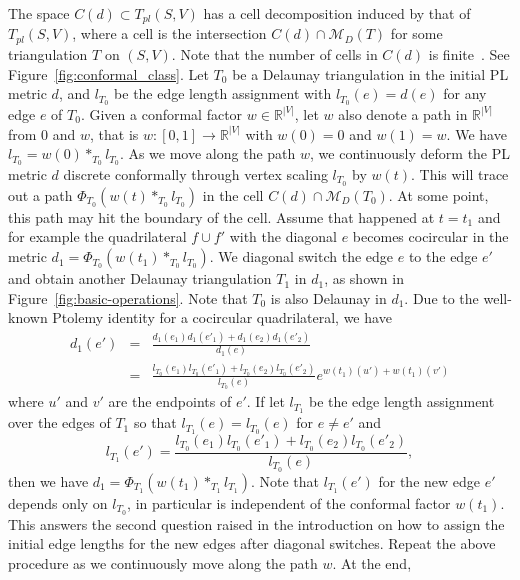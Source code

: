 \documentclass[11pt]{article}
\begin{document}
The space $C(d)\subset T_{pl}(S, V)$ has a cell 
decomposition induced by that of $T_{pl}(S, V)$, where a cell is the intersection 
$C(d)\cap \mathcal{M}_D(T)$ for some triangulation $T$ on $(S, V)$. 
Note that the number of cells in $C(d)$ is finite~\cite{glsw1}. See Figure~\ref{fig:conformal_class}.
Let $T_0$ be a Delaunay triangulation in the initial PL metric $d$, and $l_{T_0}$ be the
edge length assignment with $l_{T_0}(e)=d(e)$ for any edge $e$ of $T_0$. Given a conformal factor 
$w\in \mathbb{R}^{|V|}$, let $w$ also denote a path in $\mathbb{R}^{|V|}$ from $0$ and $w$, 
that is $w: [0, 1]\rightarrow  \mathbb{R}^{|V|}$ with $w(0) =0$ and $w(1)= w$.
We have $l_{T_0} = w(0)*_{T_0}l_{T_0}$. As we move along the path $w$, we continuously 
deform the PL metric $d$ discrete conformally through vertex scaling $l_{T_0}$ by $w(t)$.
This will trace out a path $\Phi_{T_0}(w(t)*_{T_0} l_{T_0})$ in the cell $C(d)\cap \mathcal{M}_D(T_0)$. 
At some point, this path may hit the boundary of 
the cell. Assume that happened at $t=t_1$ and for example the quadrilateral $f\cup f'$ with the diagonal $e$
becomes cocircular in the metric $d_1 = \Phi_{T_0}(w(t_1)*_{T_0} l_{T_0})$.
We diagonal switch the edge $e$ to the edge $e'$ and obtain another Delaunay 
triangulation $T_1$ in $d_1$, as shown in Figure~\ref{fig:basic-operations}.
Note that $T_0$ is also Delaunay in $d_1$. Due to the well-known Ptolemy identity 
for a  cocircular quadrilateral, we have 
\begin{eqnarray}
d_1(e') &=& \frac{d_1(e_1)d_1(e'_1) + d_1(e_2)d_1(e'_2)}{d_1(e)} \nonumber \\
        &=& \frac{l_{T_0}(e_1)l_{T_0}(e'_1) + l_{T_0}(e_2)l_{T_0}(e'_2)}{l_{T_0}(e)}e^{w(t_1)(u') + w(t_1)(v')}
\end{eqnarray}
where $u'$ and $v'$ are the endpoints of $e'$.
If let $l_{T_1}$ be the edge length assignment over the 
edges of $T_1$ so that $l_{T_1}(e) = l_{T_0}(e)$ for $e\neq e'$ and 
\begin{equation}
l_{T_1}(e') = \frac{l_{T_0}(e_1)l_{T_0}(e'_1) + l_{T_0}(e_2)l_{T_0}(e'_2)}{l_{T_0}(e)}, 
\end{equation}
then we have $d_1 =\Phi_{T_1}(w(t_1)*_{T_1} l_{T_1})$. Note that $l_{T_1}(e')$ for the new edge $e'$ 
depends only on $l_{T_0}$, in particular is independent of the conformal factor $w(t_1)$.  
This answers the second question raised in the introduction on how to assign the initial edge lengths
for the new edges after diagonal switches. 
Repeat the above procedure as we continuously move along the path $w$. At the end, 
\end{document}
